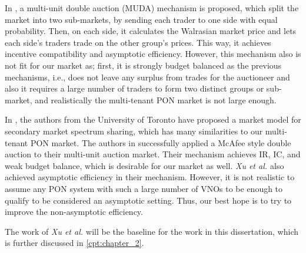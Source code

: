 In \cite{muda}, a multi-unit double auction (MUDA) mechanism is proposed, which split the market into two sub-markets, by sending each trader to one side with equal probability. Then, on each side, it calculates the Walrasian market price and lets each side's traders trade on the other group's prices. This way, it achieves incentive compatibility and asymptotic efficiency. However, this mechanism also is not fit for our market as; first, it is strongly budget balanced as the previous mechanisms, i.e., does not leave any surplus from trades for the auctioneer and also it requires a large number of traders to form two distinct groups or sub-market, and realistically the multi-tenant \ac{PON} market is not large enough.

In \cite{5462277}, the authors from the University of Toronto have proposed a market model for secondary market spectrum sharing, which has many similarities to our multi-tenant \ac{PON} market. The authors in \cite{5462277} successfully applied a McAfee \cite{MCAFEE1992434} style double auction to their multi-unit auction market. Their mechanism achieves \ac{IR}, \ac{IC}, and weak budget balance, which is desirable for our market as well. \textit{Xu et al. \cite{5462277}} also achieved asymptotic efficiency in their mechanism. However, it is not realistic to assume any \ac{PON} system with such a large number of \acp{VNO} to be enough to qualify to be considered an asymptotic setting. Thus, our best hope is to try to improve the non-asymptotic efficiency.

The work of \textit{Xu et al. \cite{5462277}} will be the baseline for the work in this dissertation, which is further discussed in \ref{cpt:chapter_2}.

